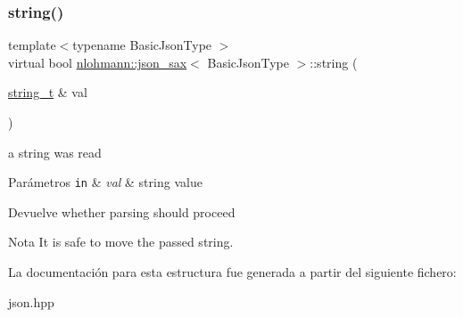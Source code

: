 \subsubsection{\texorpdfstring{string()}{string()}}
{\footnotesize\ttfamily template$<$typename Basic\+Json\+Type $>$ \\
virtual bool \mbox{\hyperlink{structnlohmann_1_1json__sax}{nlohmann\+::json\+\_\+sax}}$<$ Basic\+Json\+Type $>$\+::string (\begin{DoxyParamCaption}\item[{\mbox{\hyperlink{structnlohmann_1_1json__sax_ae01977a9f3c5b3667b7a2929ed91061e}{string\+\_\+t}} \&}]{val }\end{DoxyParamCaption})\hspace{0.3cm}{\ttfamily [pure virtual]}}



a string was read 


\begin{DoxyParams}[1]{Parámetros}
\mbox{\tt in}  & {\em val} & string value \\
\hline
\end{DoxyParams}
\begin{DoxyReturn}{Devuelve}
whether parsing should proceed 
\end{DoxyReturn}
\begin{DoxyNote}{Nota}
It is safe to move the passed string. 
\end{DoxyNote}


La documentación para esta estructura fue generada a partir del siguiente fichero\+:\begin{DoxyCompactItemize}
\item 
json.\+hpp\end{DoxyCompactItemize}
